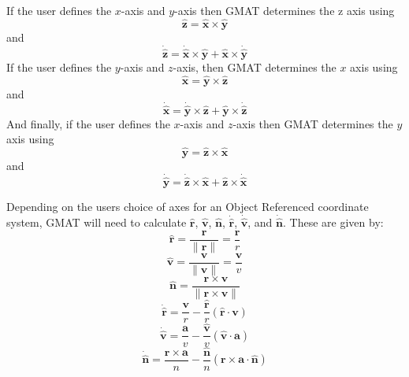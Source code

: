 {If the user defines the $x$-axis and $y$-axis then GMAT determines
the z axis using
%
\begin{equation}
    \hat{\mathbf{z}} =  \hat{\mathbf{x}}\times\hat{\mathbf{y}}
\end{equation}
%
and
%
\begin{equation}
    \dot{\hat{\mathbf{z}}} =  \dot{\hat{\mathbf{x}}}
    \times\hat{\mathbf{y}}+  \hat{\mathbf{x}} \times
    \dot{\hat{\mathbf{y}}}
\end{equation}
%
If the user defines the $y$-axis and $z$-axis, then GMAT determines
the $x$ axis using
%
\begin{equation}
    \hat{\mathbf{x}} =  \hat{\mathbf{y}}\times\hat{\mathbf{z}}
\end{equation}
%
and
%
\begin{equation}
    \dot{\hat{\mathbf{x}}} =  \dot{\hat{\mathbf{y}}}
    \times\hat{\mathbf{z}}+  \hat{\mathbf{y}} \times
    \dot{\hat{\mathbf{z}}}
\end{equation}
%
And finally, if the user defines the $x$-axis and $z$-axis then GMAT
determines the $y$ axis using
%
\begin{equation}
    \hat{\mathbf{y}} =  \hat{\mathbf{z}}\times\hat{\mathbf{x}}
\end{equation}
%
and
%
\begin{equation}
    \dot{\hat{\mathbf{y}}} =  \dot{\hat{\mathbf{z}}}
    \times\hat{\mathbf{x}}+  \hat{\mathbf{z}} \times
    \dot{\hat{\mathbf{x}}}
\end{equation}
%


Depending on the users choice of axes for an Object Referenced
coordinate system, GMAT will need to calculate $\hat{\mathbf{r}}$,
$\hat{\mathbf{v}}$, $\hat{\mathbf{n}}$, $\dot{\hat{\mathbf{r}}}$,
$\dot{\hat{\mathbf{v}}}$, and $\dot{\hat{\mathbf{n}}}$.  These are
given by:
%
\begin{equation}
\hat{\mathbf{r}} = \frac{\mathbf{r}}{\| \mathbf{r}
     \|} = \frac{\mathbf{r}}{r}
\end{equation}
%
\begin{equation}
     \hat{\mathbf{v}} = \frac{\mathbf{v}}{\| \mathbf{v}
     \|} = \frac{\mathbf{v}}{v}
\end{equation}
%
\begin{equation}
     \hat{\mathbf{n}} = \frac{\mathbf{r}\times \mathbf{v}}{ \| \mathbf{r}\times \mathbf{v}
     \|}
\end{equation}
%
\begin{equation}
    \dot{\hat{\mathbf{r}}} = \frac{\mathbf{v}}{r}  -
     \frac{\hat{\mathbf{r}}}{r}
     \left(\hat{\mathbf{r}} \cdot
     \mathbf{v} \right)
\end{equation}
%
\begin{equation}
    \dot{\hat{\mathbf{v}}} = \frac{\mathbf{a}}{v} -
    \frac{\hat{\mathbf{v}}}{v}\left(\hat{\mathbf{v}}\cdot\mathbf{a}\right)
\end{equation}
%
\begin{equation}
     \dot{\hat{\mathbf{n}}} = \frac{\mathbf{r} \times \mathbf{a}}{n} - \frac{\hat{\mathbf{n}}}{n} \left(  \mathbf{r}\times\mathbf{a} \cdot \hat{\mathbf{n}} \right)
     \label{Eq:VBN_Ndot}
\end{equation}



}
